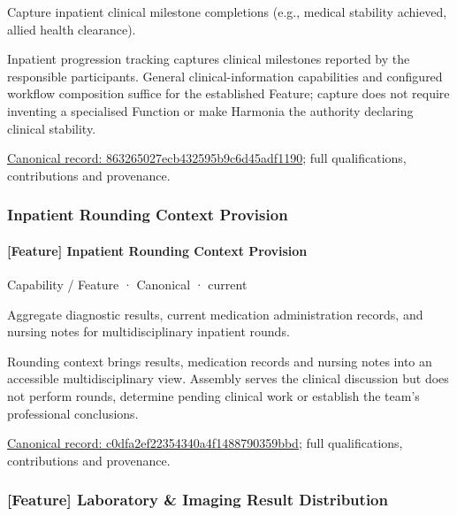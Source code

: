 Capture inpatient clinical milestone completions (e.g., medical stability achieved, allied health clearance).



Inpatient progression tracking captures clinical milestones reported by the responsible participants. General clinical-information capabilities and configured workflow composition suffice for the established Feature; capture does not require inventing a specialised Function or make Harmonia the authority declaring clinical stability.


{\footnotesize \href{../../../../continuum/strategy/capability/feature/863265027ecb432595b9c6d45adf1190.md}{Canonical record: 863265027ecb432595b9c6d45adf1190}; full qualifications, contributions and provenance.}\par
\subsubsection{Inpatient Rounding Context Provision}

\paragraph{[Feature] Inpatient Rounding Context Provision}

\label{element:c0dfa2ef22354340a4f1488790359bbd}
{\small Capability / Feature · Canonical · current}\par

Aggregate diagnostic results, current medication administration records, and nursing notes for multidisciplinary inpatient rounds.



Rounding context brings results, medication records and nursing notes into an accessible multidisciplinary view. Assembly serves the clinical discussion but does not perform rounds, determine pending clinical work or establish the team's professional conclusions.


{\footnotesize \href{../../../../continuum/strategy/capability/feature/c0dfa2ef22354340a4f1488790359bbd.md}{Canonical record: c0dfa2ef22354340a4f1488790359bbd}; full qualifications, contributions and provenance.}\par
\subsubsection{[Feature] Laboratory \& Imaging Result Distribution}


